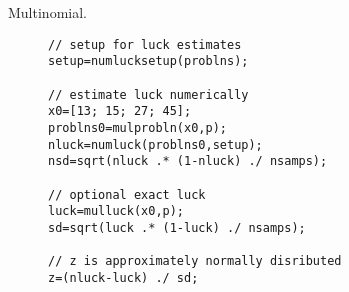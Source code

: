 \begin{example}{Multinomial.}
\begin{figure}
\begin{lstlisting}
// setup for luck estimates
setup=numlucksetup(problns);

// estimate luck numerically
x0=[13; 15; 27; 45];
problns0=mulprobln(x0,p);
nluck=numluck(problns0,setup);
nsd=sqrt(nluck .* (1-nluck) ./ nsamps);

// optional exact luck
luck=mulluck(x0,p);
sd=sqrt(luck .* (1-luck) ./ nsamps);

// z is approximately normally disributed
z=(nluck-luck) ./ sd;
\end{lstlisting}
\end{figure}
\end{example}
